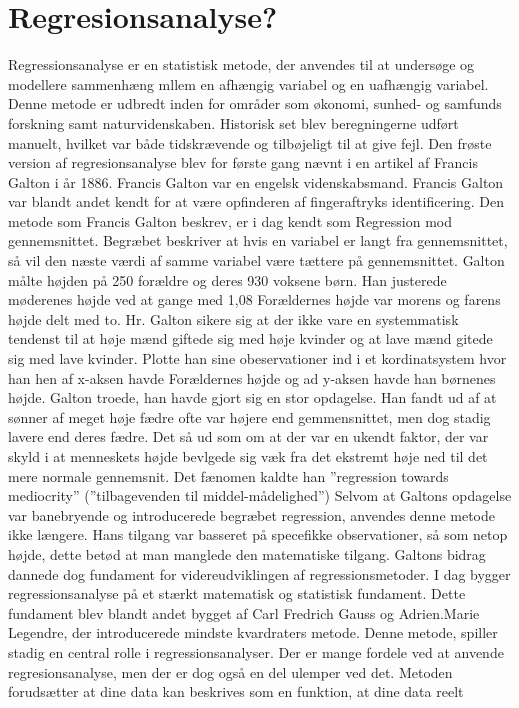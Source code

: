 \section{Regresionsanalyse?}\label{sec:regresionsanalyse}
Regressionsanalyse er en statistisk metode, der anvendes til at undersøge og modellere sammenhæng mllem en afhængig variabel og en uafhængig variabel. Denne metode er udbredt inden for områder som økonomi, sunhed- og samfunds forskning samt naturvidenskaben. Historisk set blev beregningerne udført manuelt, hvilket var både tidskrævende og tilbøjeligt til at give fejl. Den frøste version af regresionsanalyse blev for første gang nævnt i en artikel af Francis Galton i år 1886. Francis Galton var en engelsk videnskabsmand. Francis Galton var blandt andet kendt for at være opfinderen af fingeraftryks identificering. Den metode som Francis Galton beskrev, er i dag kendt som Regression mod gennemsnittet. Begræbet beskriver at hvis en variabel er langt fra gennemsnittet, så vil den næste værdi af samme variabel være tættere på gennemsnittet. Galton målte højden på 250 forældre og deres 930 voksene børn. Han justerede møderenes højde ved at gange med 1,08 Forældernes højde var morens og farens højde delt med to. Hr. Galton sikere sig at der ikke vare en systemmatisk tendenst til at høje mænd giftede sig med høje kvinder og at lave mænd gitede sig med lave kvinder. Plotte han sine obeservationer ind i et kordinatsystem hvor han hen af x-aksen havde Forældernes højde og ad y-aksen havde han børnenes højde. Galton troede, han havde gjort sig en stor opdagelse. Han fandt ud af at sønner af meget høje fædre ofte var højere end gemmensnittet, men dog stadig lavere end deres fædre. Det så ud som om at der var en ukendt faktor, der var skyld i at menneskets højde bevlgede sig væk fra det ekstremt høje ned til det mere normale gennemsnit. Det fænomen kaldte han ”regression towards mediocrity” (”tilbagevenden til middel-mådelighed”) %
Selvom at Galtons opdagelse var banebryende og introducerede begræbet regression, anvendes denne metode ikke længere. Hans tilgang var basseret på specefikke observationer, så som netop højde, dette betød at man manglede den matematiske tilgang. Galtons bidrag dannede dog fundament for videreudviklingen af regressionsmetoder. I dag bygger regressionsanalyse på et stærkt matematisk og statistisk fundament. Dette fundament blev blandt andet bygget af Carl Fredrich Gauss og Adrien.Marie Legendre, der introducerede mindste kvardraters metode. Denne metode, spiller stadig en central rolle i regressionsanalyser. Der er mange fordele ved at anvende regresionsanalyse, men der er dog også en del ulemper ved det. Metoden forudsætter at dine data kan beskrives som en funktion, at dine data reelt 
